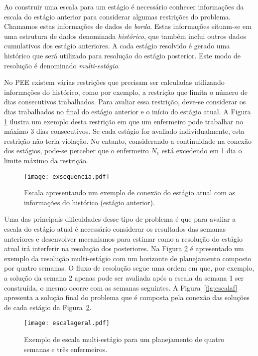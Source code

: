 \documentclass[cic,tc, twoside]{iiufrgs}
\begin{document}
Ao construir uma escala para um estágio é necessário conhecer informações da escala do estágio anterior para considerar algumas restrições do problema. Chamamos estas informações de dados de \emph{borda}. Estas informações situam-se em uma estrutura de dados denominada \emph{histórico}, que também inclui outros dados cumulativos dos estágio anteriores. 
A cada estágio resolvido é gerado uma histórico que será utilizado para resolução do estágio posterior. 
Este modo de resolução é denominado \emph{multi-estágio}. 

No PEE existem várias restrições que precisam ser calculadas utilizando informações do histórico, como por exemplo, a restrição que limita o número de dias consecutivos trabalhados. Para avaliar essa restrição, deve-se considerar os dias trabalhados no final do estágio anterior e o início do estágio atual. A Figura \ref{fig:escalaSeq} ilustra um exemplo desta restrição em que um enfermeiro pode trabalhar no máximo 3 dias consecutivos. Se cada estágio for avaliado individualmente, esta restrição não teria violação. No entanto, considerando a continuidade na conexão dos estágios, pode-se perceber que o enfermeiro $N_1$ está excedendo em 1 dia o limite máximo da restrição.  

\begin{figure}[H]
\texttt{[image: exsequencia.pdf]}
\centering
\caption{Escala apresentando um exemplo de conexão do estágio atual com as informações do histórico (estágio anterior).}
\label{fig:escalaSeq}
\end{figure}


Uma das principais dificuldades desse tipo de problema é que para avaliar a escala do estágio atual é necessário considerar os resultados das semanas anteriores e desenvolver mecanismos para estimar como a resolução do estágio atual irá interferir na resolução dos posteriores. Na Figura \ref{fig:escalaMultiestagio} é apresentado um exemplo da resolução multi-estágio com um horizonte de planejamento composto por quatro semanas. O fluxo de resolução segue uma ordem em que, por exemplo, a solução da semana 2 apenas pode ser avaliada após a escala da semana 1 ser construída, o mesmo ocorre com as semanas seguintes. A Figura~\ref{fig:escalaf} apresenta a solução final do problema que é composta pela conexão das soluções de cada estágio da Figura~\ref{fig:escalaMultiestagio}.

\begin{figure}[ht!]
\texttt{[image: escalageral.pdf]}
\centering
\caption{Exemplo de escala multi-estágio para um planejamento de quatro semanas e três enfermeiros.}
\label{fig:escalaMultiestagio}
\end{figure}
\end{document}
